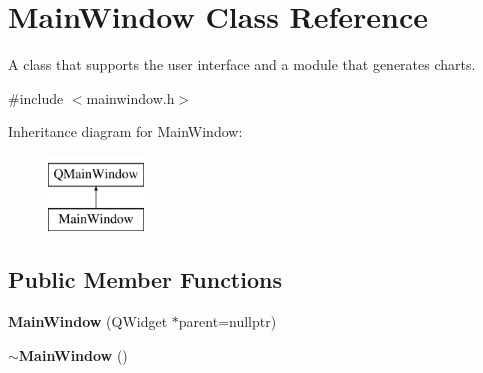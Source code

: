 \section{Main\+Window Class Reference}
\label{class_main_window}


A class that supports the user interface and a module that generates charts.  




{\ttfamily \#include $<$mainwindow.\+h$>$}

Inheritance diagram for Main\+Window\+:\begin{figure}[H]
\begin{center}
\leavevmode
\includegraphics[height=2.000000cm]{class_main_window}
\end{center}
\end{figure}
\subsection*{Public Member Functions}
\begin{DoxyCompactItemize}
\item 
\textbf{ Main\+Window} (Q\+Widget $\ast$parent=nullptr)
\item 
\textbf{ $\sim$\+Main\+Window} ()
\end{DoxyCompactItemize}
